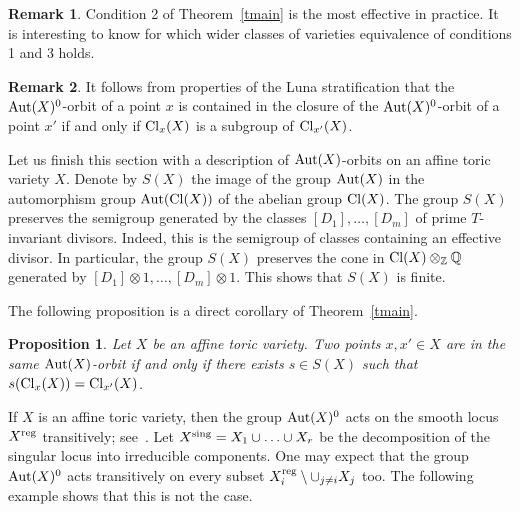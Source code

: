 \documentclass[12pt,a4paper]{amsart}
\theoremstyle{plain}
\newtheorem{proposition}{Proposition}
\theoremstyle{definition}
\newtheorem{remark}{Remark}
\begin{document}
\begin{remark}
Condition 2 of Theorem~\ref{tmain} is the most effective in practice.
It is interesting to know for which wider classes of varieties equivalence
of conditions 1 and 3 holds.
\end{remark}

\begin{remark}
It follows from properties of the Luna stratification that the ${\mathop{\rm Aut}}(X)^0$-orbit
of a point $x$ is contained in the closure of the ${\mathop{\rm Aut}}(X)^0$-orbit of a point $x'$
if and only if ${\mathop{\rm Cl}}_x(X)$ is a subgroup of ${\mathop{\rm Cl}}_{x'}(X)$.
\end{remark}

Let us finish this section with a description of ${\mathop{\rm Aut}}(X)$-orbits on an affine
toric variety $X$. Denote by $S(X)$ the image of the group ${\mathop{\rm Aut}}(X)$ in the
automorphism group ${\mathop{\rm Aut}}({\mathop{\rm Cl}}(X))$ of the abelian group ${\mathop{\rm Cl}}(X)$. The group
$S(X)$ preserves the semigroup generated by the classes $[D_1],\ldots,[D_m]$
of prime $T$-invariant divisors. Indeed, this is the semigroup of
classes containing an effective divisor.
In particular, the group $S(X)$ preserves the cone in ${\mathop{\rm Cl}}(X)\otimes_{{\mathbb Z}}{{\mathbb Q}}$
generated by $[D_1]\otimes 1,\ldots,[D_m]\otimes 1$. This shows that
$S(X)$ is finite.

\smallskip

The following proposition is a direct corollary of Theorem~\ref{tmain}.

\begin{proposition}
Let $X$ be an affine toric variety. Two points $x,x'\in X$
are in the same ${\mathop{\rm Aut}}(X)$-orbit if and only if there exists
$s\in S(X)$ such that $s({\mathop{\rm Cl}}_x(X))={\mathop{\rm Cl}}_{x'}(X)$.
\end{proposition}

If $X$ is an affine toric variety, then the group ${\mathop{\rm Aut}}(X)^0$ acts
on the smooth locus $X^{\mathop{\rm reg}}$ transitively; see~\cite[Theorem~2.1]{AKZ}.
Let $X^{\mathop{\rm sing}}=X_1\cup\ldots\cup X_r$ be the decomposition of the singular
locus into irreducible components. One may expect that the group ${\mathop{\rm Aut}}(X)^0$
acts transitively on every subset $X^{\mathop{\rm reg}}_i\setminus \cup_{j\ne i} X_j$ too.
The following example shows that this is not the case.
\end{document}
